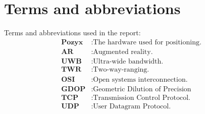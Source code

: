 \chapter*{Terms and abbreviations}
Terms and abbreviations used in the report:
\begin{align*}
    \textbf{Pozyx} &: \text{The hardware used for positioning.} \\
    \textbf{AR} &: \text{Augmented reality.} \\
    \textbf{UWB} &: \text{Ultra-wide bandwidth.} \\
    \textbf{TWR} &: \text{Two-way-ranging.} \\
    \textbf{OSI} &: \text{Open systems interconnection.} \\
    \textbf{GDOP} &: \text{Geometric Dilution of Precision} \\
    \textbf{TCP} &: \text{Transmission Control Protocol.} \\
    \textbf{UDP} &: \text{User Datagram Protocol.} \\
\end{align*}